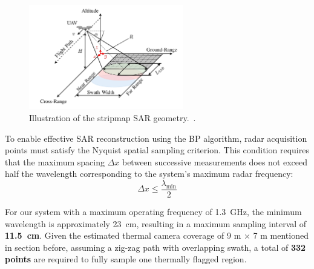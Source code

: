 \begin{figure}[H]
    \centering
    \includegraphics[width=0.6\textwidth]{figs/Huirui/gpr_swath}
    \caption{Illustration of the stripmap SAR geometry.~\cite{schartel2018uav}.}
    \label{fig:swath_geometry}
\end{figure}

To enable effective SAR reconstruction using the BP algorithm, radar acquisition points must satisfy the Nyquist spatial sampling criterion. This condition requires that the maximum spacing $\Delta x$ between successive measurements does not exceed half the wavelength corresponding to the system's maximum radar frequency:
\[
\Delta x \leq \frac{\lambda_{\text{min}}}{2}
\]

For our system with a maximum operating frequency of 1.3~GHz, the minimum wavelength is approximately 23~cm, resulting in a maximum sampling interval of \textbf{11.5~cm}. Given the estimated thermal camera coverage of 9 m × 7 m mentioned in section before, assuming a zig-zag path with overlapping swath, a total of \textbf{332 points} are required to fully sample one thermally flagged region. 